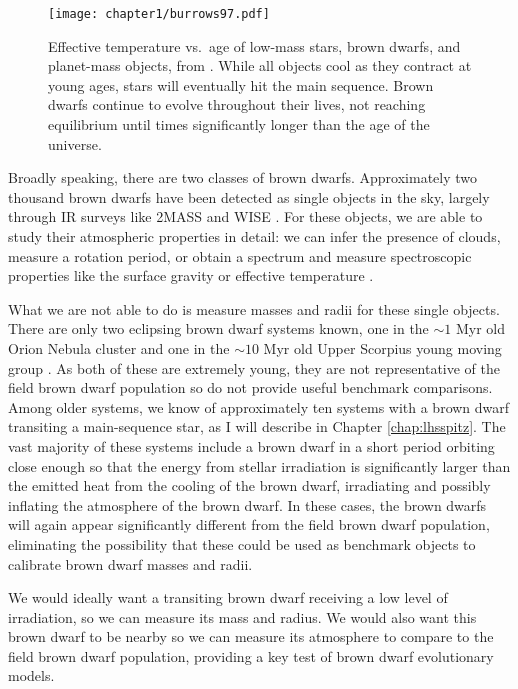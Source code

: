 \begin{figure}[hbt!]
\centering
\texttt{[image: chapter1/burrows97.pdf]}
\caption[Brown dwarf temperature evolution in time]{Effective temperature vs.\ age of low-mass stars,
brown dwarfs, and planet-mass objects, from \citet{Burrows97}. While all objects cool as they contract
at young ages, stars will eventually hit the main sequence. Brown dwarfs continue to evolve throughout
their lives, not reaching equilibrium until times significantly longer than the age of the universe.}
\label{fig:burrows}
\end{figure}



Broadly speaking, there are two classes of brown dwarfs.
Approximately two thousand brown dwarfs have been detected as single objects in the sky,
largely through IR surveys like 2MASS and WISE \citep[e.g.][]{Kirkpatrick99, Kirkpatrick11}.
For these objects, we are able to study their atmospheric properties in detail: we can 
infer the presence of clouds, measure a rotation period, or obtain a spectrum and measure
spectroscopic properties like the surface gravity or effective temperature \citep[e.g.][]{Faherty14, Filippazzo15}. 

What we are not able to do is measure masses and radii for these single objects.
There are only two eclipsing brown dwarf systems known, one in the $\sim 1$ Myr old Orion
Nebula cluster and one in the $\sim 10$ Myr old Upper Scorpius young moving group
\citep{Stassun06, David16}.
As both of these are extremely young, they are not representative of the field brown dwarf
population so do not provide useful benchmark comparisons.
Among older systems, we know of approximately ten systems with a brown dwarf transiting a main-sequence star, as I will describe in Chapter \ref{chap:lhsspitz}.
The vast majority of these systems include a brown dwarf in a short period orbiting
close enough so that the energy from stellar irradiation is significantly larger than
the emitted heat from the cooling of the brown dwarf, irradiating and possibly inflating
the atmosphere of the brown dwarf.
In these cases, the brown dwarfs will again appear significantly different from the field
brown dwarf population, eliminating the possibility that these could be used as benchmark
objects to calibrate brown dwarf masses and radii.


We would ideally want a transiting brown dwarf receiving a low level of irradiation,
so we can measure its mass and radius.
We would also want this brown dwarf to be nearby so we can measure its atmosphere to
compare to the field brown dwarf population, providing a key test of brown dwarf
evolutionary models.

